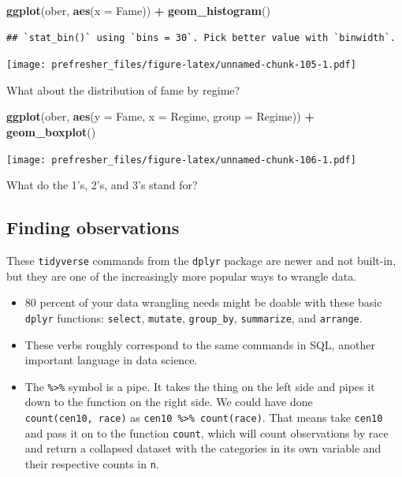 \documentclass[]{book}
\newenvironment{Shaded}{\begin{snugshade}}{\end{snugshade}}
\newcommand{\DataTypeTok}[1]{\textcolor[rgb]{0.13,0.29,0.53}{#1}}
\newcommand{\KeywordTok}[1]{\textcolor[rgb]{0.13,0.29,0.53}{\textbf{#1}}}
\newcommand{\NormalTok}[1]{#1}
\newcommand{\OperatorTok}[1]{\textcolor[rgb]{0.81,0.36,0.00}{\textbf{#1}}}
\newcommand{\StringTok}[1]{\textcolor[rgb]{0.31,0.60,0.02}{#1}}
\providecommand{\tightlist}{%
  \setlength{\itemsep}{0pt}\setlength{\parskip}{0pt}}
\theoremstyle{definition}
\theoremstyle{definition}
\theoremstyle{definition}
\theoremstyle{remark}
\begin{document}
\begin{Shaded}
\begin{Highlighting}[]
\KeywordTok{ggplot}\NormalTok{(ober, }\KeywordTok{aes}\NormalTok{(}\DataTypeTok{x =}\NormalTok{ Fame)) }\OperatorTok{+}\StringTok{ }\KeywordTok{geom_histogram}\NormalTok{()}
\end{Highlighting}
\end{Shaded}

\begin{verbatim}
## `stat_bin()` using `bins = 30`. Pick better value with `binwidth`.
\end{verbatim}

\texttt{[image: prefresher\_files/figure-latex/unnamed-chunk-105-1.pdf]}

What about the distribution of fame by regime?

\begin{Shaded}
\begin{Highlighting}[]
\KeywordTok{ggplot}\NormalTok{(ober, }\KeywordTok{aes}\NormalTok{(}\DataTypeTok{y =}\NormalTok{ Fame, }\DataTypeTok{x =}\NormalTok{ Regime, }\DataTypeTok{group =}\NormalTok{ Regime)) }\OperatorTok{+}
\StringTok{  }\KeywordTok{geom_boxplot}\NormalTok{()}
\end{Highlighting}
\end{Shaded}

\texttt{[image: prefresher\_files/figure-latex/unnamed-chunk-106-1.pdf]}

What do the 1's, 2's, and 3's stand for?

\hypertarget{finding-observations}{%
\subsection{Finding observations}\label{finding-observations}}

These \texttt{tidyverse} commands from the \texttt{dplyr} package are newer and not built-in, but they are one of the increasingly more popular ways to wrangle data.

\begin{itemize}
\tightlist
\item
  80 percent of your data wrangling needs might be doable with these basic \texttt{dplyr} functions: \texttt{select}, \texttt{mutate}, \texttt{group\_by}, \texttt{summarize}, and \texttt{arrange}.
\item
  These verbs roughly correspond to the same commands in SQL, another important language in data science.
\item
  The \texttt{\%\textgreater{}\%} symbol is a pipe. It takes the thing on the left side and pipes it down to the function on the right side. We could have done \texttt{count(cen10,\ race)} as \texttt{cen10\ \%\textgreater{}\%\ count(race)}. That means take \texttt{cen10} and pass it on to the function \texttt{count}, which will count observations by race and return a collapsed dataset with the categories in its own variable and their respective counts in \texttt{n}.
\end{itemize}
\end{document}
